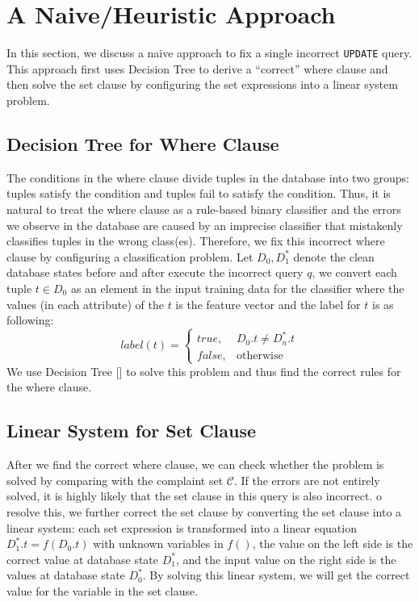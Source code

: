 \section{A Naive/Heuristic Approach}
\label{sec:heuristic}

In this section, we discuss a naive approach to fix
a single incorrect \texttt{UPDATE} query. 
This approach first uses 
Decision Tree to derive a ``correct'' where clause 
and then solve the set clause by configuring the set 
expressions into a linear system problem. 
\subsection{Decision Tree for Where Clause}
The conditions in the where clause divide tuples in
the database into two groups: tuples satisfy 
the condition and tuples fail to satisfy the condition. 
Thus, it is natural to treat the where clause as a rule-based
binary classifier and the errors we observe in the database 
are caused by an imprecise classifier that mistakenly 
classifies tuples in the wrong class(es). Therefore, 
we fix this incorrect
where clause by configuring a classification problem.
Let $D_0, D_1^*$ denote the clean database states before and after 
execute the incorrect query $q$, 
we convert each tuple $t \in D_0$ as 
an element in the input training data for the classifier where
the values (in each attribute) of the $t$ is the feature vector 
and the label for $t$ is as following:
	\[
    label(t)= 
    \begin{cases}
    true ,& D_0.t \neq D_n^*.t\\
    false,              & \text{otherwise}
    \end{cases}
\]
We use Decision Tree [] to solve this problem and thus find the correct 
rules for the where clause. 
\subsection{Linear System for Set Clause}
After we find the correct where clause, we can check whether the problem
is solved by comparing 
with the complaint set $\mathcal{C}$. If the errors are not entirely solved, 
it is highly likely that the set clause in this query is also incorrect. 
o resolve this, we further correct the set clause by converting the set
clause into a linear system: each set expression is transformed into a linear
equation $D_1^*.t = f(D_0.t)$ with unknown variables in $f()$, 
the value on the left side is the correct value at database state $D_1^*$, 
and the input value on the right side is the values at database state $D_0^*$.
By solving this linear system, we will get the correct value for the variable 
in the set clause. 
